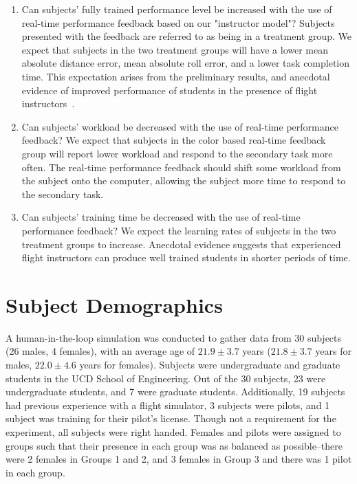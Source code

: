 \documentclass[]{aiaa-tc}%
\begin{document}
\begin{enumerate}
  \itemsep0em
  \item Can subjects' fully trained performance level be increased with the use of real-time performance feedback based on our "instructor model"? Subjects presented with the feedback are referred to as being in a treatment group. We expect that subjects in the two treatment groups will have a lower mean absolute distance error, mean absolute roll error, and a lower task completion time. This expectation arises from the preliminary results, and anecdotal evidence of improved performance of students in the presence of flight instructors~\cite{karasinski2016development}.
  \item Can subjects' workload be decreased with the use of real-time performance feedback? We expect that subjects in the color based real-time feedback group will report lower workload and respond to the secondary task more often. The real-time performance feedback should shift some workload from the subject onto the computer, allowing the subject more time to respond to the secondary task.
  \item Can subjects' training time be decreased with the use of real-time performance feedback? We expect the learning rates of subjects in the two treatment groups to increase. Anecdotal evidence suggests that experienced flight instructors can produce well trained students in shorter periods of time.
\end{enumerate}

\section{Subject Demographics}
A human-in-the-loop simulation was conducted to gather data from 30 subjects (26 males, 4 females), with an average age of $21.9\pm3.7$ years ($21.8\pm3.7$ years for males, $22.0\pm4.6$ years for females). Subjects were undergraduate and graduate students in the UCD School of Engineering. Out of the 30 subjects, 23 were undergraduate students, and 7 were graduate students. Additionally, 19 subjects had previous experience with a flight simulator, 3 subjects were pilots, and 1 subject was training for their pilot's license. Though not a requirement for the experiment, all subjects were right handed. Females and pilots were assigned to groups such that their presence in each group was as balanced as possible--there were 2 females in Groups 1 and 2, and 3 females in Group 3 and there was 1 pilot in each group.
\end{document}
